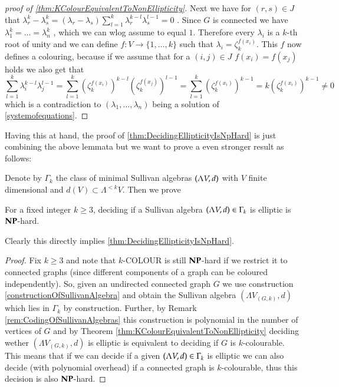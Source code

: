 \begin{proof}[proof of \ref{thm:KColourEquivalentToNonEllipticity}]
  Next we have
  for $(r,s) \in J$ that $ \lambda_r^k - \lambda_s^k = ( \lambda_r - \lambda_s) 
  \sum_{l = 1}^k \lambda_r^{k - l} \lambda_s^{l - 1} = 0$ . Since $G$ is connected we have 
  $\lambda_1^k = \dotsc = \lambda_n^k$ , which we can wlog assume to equal $1$. Therefore every $\lambda_i$ is a 
  $k$-th root of unity and we can define $f \colon V \to { \lbrace 1, \dotsc , k \rbrace }$ such that 
  $\lambda_i = \zeta_k^{f(x_i)}$. This $f$ now defines a colouring, because if we assume that for a $(i,j) \in J$
  $f(x_i) = f(x_j)$ holds we also get that 
  $$\sum_{l = 1}^k \lambda_i^{k - l} \lambda_j^{l - 1} = \sum_{l = 1}^k (\zeta_k^{f(x_i)})^{k-l} (\zeta_k^{f(x_j)})^{l-1}
  = \sum_{l = 1}^k (\zeta_k^{f(x_i)})^{k-1} = k (\zeta_k^{f(x_i)})^{k-1} \neq 0$$ 
  which is a contradiction to $(\lambda_1 , \dotsc, \lambda_n)$ being a solution of \ref{systemofequations}.
  
 \end{proof}

 Having this at hand, the proof of \ref{thm:DecidingEllipticityIsNpHard} is just combining the above lemmata but we 
 want to prove a even stronger result as follows:
 
 Denote by $\Gamma_k$ the class of minimal Sullivan algebras $(\Lambda V,d)$ with $V$ finite dimensional and
 $d(V) \subset \Lambda^{< k} V$. Then we prove
 
 \begin{Theorem}
  For a fixed integer $k \geq 3$, deciding if a Sullivan algebra $(\Lambda V,d) \in \Gamma_k$ is elliptic is $\mathbf{NP}$-hard. 
 \end{Theorem}

 Clearly this directly implies \ref{thm:DecidingEllipticityIsNpHard}.
 \begin{proof}
  Fix $k \geq 3$ and note that $k$-COLOUR is still $\mathbf{NP}$-hard if we restrict it to connected graphs (since different
  components of a graph can be coloured independently). So, given an undirected connected graph $G$ we use
  construction \ref{constructionOfSullivanAlgebra} and obtain the Sullivan algebra $(\Lambda V_{(G,k)},d)$ which lies
  in $\Gamma_k$ by construction. Further, by Remark \ref{rem:CodingOfSullivanAlgebras} this construction is polynomial
  in the number of vertices of $G$ and by Theorem \ref{thm:KColourEquivalentToNonEllipticity} deciding wether
  $(\Lambda V_{(G,k)},d)$ is elliptic is equivalent to deciding if $G$ is $k$-colourable. This means that if we can 
  decide if a given $(\Lambda V,d) \in \Gamma_k$ is elliptic we can also decide (with polynomial overhead) if a connected
  graph is $k$-colourable, thus this decision is also $\mathbf{NP}$-hard.
  \end{proof}

